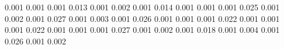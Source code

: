 0.001      0.001      %
0.001      0.013      %
0.001      0.002      %
0.001      0.014      %
0.001      0.001      %
0.001      0.025      %
0.001      0.002      %
0.001      0.027      %
0.001      0.003      %
0.001      0.026      %
0.001      0.001      %
0.001      0.022      %
0.001      0.001      %
0.001      0.022      %
0.001      0.001      %
0.001      0.027      %
0.001      0.002      %
0.001      0.018      %
0.001      0.004      %
0.001      0.026      %
0.001      0.002      %
